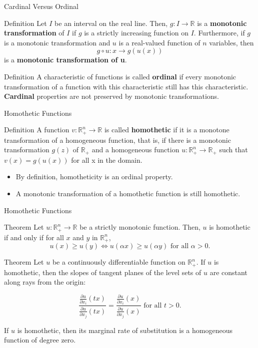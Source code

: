 \documentclass{beamer}
\begin{document}
\begin{frame}{Cardinal Versus Ordinal}
    \begin{block}{Definition}
    Let $I$ be an interval on the real line. Then, $g:I\to \mathbb{R}$ is a \textbf{monotonic transformation} of $I$ if $g$ is a strictly increasing function on $I$. Furthermore, if $g$ is a monotonic transformation and $u$ is a real-valued function of $n$ variables, then 
    \[g \circ u:x\to g(u(x))
    \]
    is a \textbf{monotonic transformation of u}.
    \end{block}
    \begin{block}{Definition}
    A characteristic of functions is called \textbf{ordinal} if every monotonic transformation of a function with this characteristic still has this characteristic. 
    \textbf{Cardinal} properties are not preserved by monotonic transformations. 
    \end{block}
\end{frame}

\begin{frame}{Homothetic Functions}
    \begin{block}{Definition}
    A function $v:\mathbb{R}_+^n\to \mathbb{R}$ is called \textbf{homothetic} if it is a monotone transformation of a homogeneous function, that is, if there is a monotonic transformation $g(z)$ of $\mathbb{R}_+$ and a homogeneous function $u:\mathbb{R}_+^n\to \mathbb{R}_+$ such that $v(x)=g(u(x))$ for all x in the domain. 
    \end{block}
    \begin{itemize}
        \item By definition, homotheticity is an ordinal property. 
        \item A monotonic transformation of a homothetic function is still homothetic.
    \end{itemize}
    \end{frame}

\begin{frame}{Homothetic Functions}
\begin{block}{Theorem}
Let $u: \mathbb{R}_+^n\to \mathbb{R}$ be a strictly monotonic function. Then, $u$ is homothetic if and only if for all $x$ and $y$ in $\mathbb{R}_+^n$, 
\[u(x)\geq u(y) \iff u(\alpha x)\geq u(\alpha y) \text{ for all }\alpha>0.
\]
\end{block}
\begin{block}{Theorem}
Let $u$ be a continuously differentiable function on $\mathbb{R}_+^n$. If $u$ is homothetic, then the slopes of tangent planes of the level sets of $u$ are constant along rays from the origin:

\[\frac{\frac{\partial u}{\partial x_i}(tx)}{\frac{\partial u}{\partial x_j}(tx)}=\frac{\frac{\partial u}{\partial x_i}(x)}{\frac{\partial u}{\partial x_j}(x)} \text{ for all }t>0.
\]
\end{block}
If $u$ is homothetic, then its marginal rate of substitution is a homogeneous function of degree zero.
\end{frame}
\end{document}
